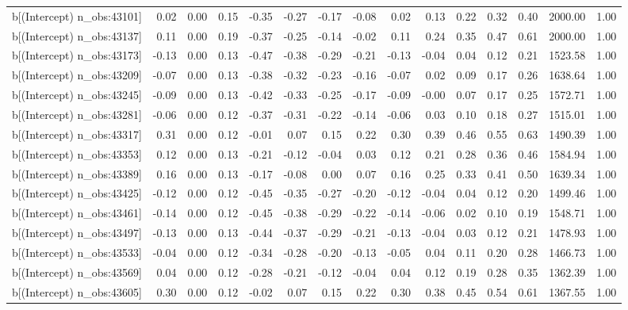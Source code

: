 \begin{table}[ht]
\begin{tabular}{rrrrrrrrrrrrrrr}
  b[(Intercept) n\_obs:43101] & 0.02 & 0.00 & 0.15 & -0.35 & -0.27 & -0.17 & -0.08 & 0.02 & 0.13 & 0.22 & 0.32 & 0.40 & 2000.00 & 1.00 \\ 
  b[(Intercept) n\_obs:43137] & 0.11 & 0.00 & 0.19 & -0.37 & -0.25 & -0.14 & -0.02 & 0.11 & 0.24 & 0.35 & 0.47 & 0.61 & 2000.00 & 1.00 \\ 
  b[(Intercept) n\_obs:43173] & -0.13 & 0.00 & 0.13 & -0.47 & -0.38 & -0.29 & -0.21 & -0.13 & -0.04 & 0.04 & 0.12 & 0.21 & 1523.58 & 1.00 \\ 
  b[(Intercept) n\_obs:43209] & -0.07 & 0.00 & 0.13 & -0.38 & -0.32 & -0.23 & -0.16 & -0.07 & 0.02 & 0.09 & 0.17 & 0.26 & 1638.64 & 1.00 \\ 
  b[(Intercept) n\_obs:43245] & -0.09 & 0.00 & 0.13 & -0.42 & -0.33 & -0.25 & -0.17 & -0.09 & -0.00 & 0.07 & 0.17 & 0.25 & 1572.71 & 1.00 \\ 
  b[(Intercept) n\_obs:43281] & -0.06 & 0.00 & 0.12 & -0.37 & -0.31 & -0.22 & -0.14 & -0.06 & 0.03 & 0.10 & 0.18 & 0.27 & 1515.01 & 1.00 \\ 
  b[(Intercept) n\_obs:43317] & 0.31 & 0.00 & 0.12 & -0.01 & 0.07 & 0.15 & 0.22 & 0.30 & 0.39 & 0.46 & 0.55 & 0.63 & 1490.39 & 1.00 \\ 
  b[(Intercept) n\_obs:43353] & 0.12 & 0.00 & 0.13 & -0.21 & -0.12 & -0.04 & 0.03 & 0.12 & 0.21 & 0.28 & 0.36 & 0.46 & 1584.94 & 1.00 \\ 
  b[(Intercept) n\_obs:43389] & 0.16 & 0.00 & 0.13 & -0.17 & -0.08 & 0.00 & 0.07 & 0.16 & 0.25 & 0.33 & 0.41 & 0.50 & 1639.34 & 1.00 \\ 
  b[(Intercept) n\_obs:43425] & -0.12 & 0.00 & 0.12 & -0.45 & -0.35 & -0.27 & -0.20 & -0.12 & -0.04 & 0.04 & 0.12 & 0.20 & 1499.46 & 1.00 \\ 
  b[(Intercept) n\_obs:43461] & -0.14 & 0.00 & 0.12 & -0.45 & -0.38 & -0.29 & -0.22 & -0.14 & -0.06 & 0.02 & 0.10 & 0.19 & 1548.71 & 1.00 \\ 
  b[(Intercept) n\_obs:43497] & -0.13 & 0.00 & 0.13 & -0.44 & -0.37 & -0.29 & -0.21 & -0.13 & -0.04 & 0.03 & 0.12 & 0.21 & 1478.93 & 1.00 \\ 
  b[(Intercept) n\_obs:43533] & -0.04 & 0.00 & 0.12 & -0.34 & -0.28 & -0.20 & -0.13 & -0.05 & 0.04 & 0.11 & 0.20 & 0.28 & 1466.73 & 1.00 \\ 
  b[(Intercept) n\_obs:43569] & 0.04 & 0.00 & 0.12 & -0.28 & -0.21 & -0.12 & -0.04 & 0.04 & 0.12 & 0.19 & 0.28 & 0.35 & 1362.39 & 1.00 \\ 
  b[(Intercept) n\_obs:43605] & 0.30 & 0.00 & 0.12 & -0.02 & 0.07 & 0.15 & 0.22 & 0.30 & 0.38 & 0.45 & 0.54 & 0.61 & 1367.55 & 1.00 \\ 

\end{tabular}
\end{table}
